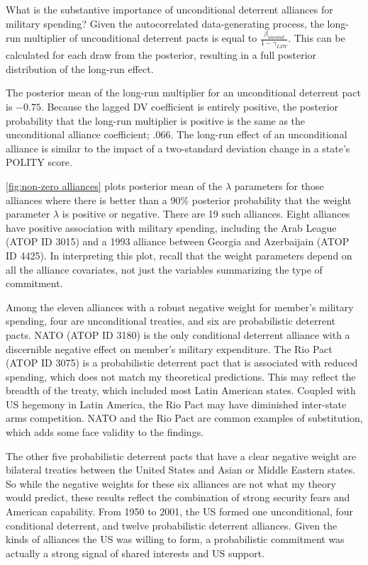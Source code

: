 \documentclass[12pt]{article}
\begin{document}
What is the substantive importance of unconditional deterrent alliances for military spending? Given the autocorrelated data-generating process, the long-run multiplier of unconditional deterrent pacts is equal to $\frac{\beta_{uncond}}{ 1 - \gamma_{LDV}}$. This can be calculated for each draw from the posterior, resulting in a full posterior distribution of the long-run effect. 

The posterior mean of the long-run multiplier for an unconditional deterrent pact is $-0.75$. Because the lagged DV coefficient is entirely positive, the posterior probability that the long-run multiplier is positive is the same as the unconditional alliance coefficient; $.066$. The long-run effect of an unconditional alliance is similar to the impact of a two-standard deviation change in a state's POLITY score. 

\autoref{fig:non-zero alliances} plots posterior mean of the $\lambda$ parameters for those alliances where there is better than a 90\% posterior probability that the weight parameter $\lambda$ is positive or negative. There are 19 such alliances. Eight alliances have positive association with military spending, including the Arab League (ATOP ID 3015) and a 1993 alliance between Georgia and Azerbaijain (ATOP ID 4425). In interpreting this plot, recall that the weight parameters depend on all the alliance covariates, not just the variables summarizing the type of commitment. 

Among the eleven alliances with a robust negative weight for member's military spending, four are unconditional treaties, and six are probabilistic deterrent pacts. NATO (ATOP ID 3180) is the only conditional deterrent alliance with a discernible negative effect on member's military expenditure.  The Rio Pact (ATOP ID 3075) is a probabilistic deterrent pact that is associated with reduced spending, which does not match my theoretical predictions. This may reflect the breadth of the treaty, which included most Latin American states. Coupled with US hegemony in Latin America, the Rio Pact may have diminished inter-state arms competition. NATO and the Rio Pact are common examples of substitution, which adds some face validity to the findings. 

The other five probabilistic deterrent pacts that have a clear negative weight are bilateral treaties between the United States and Asian or Middle Eastern states. So while the negative weights for these six alliances are not what my theory would predict, these results reflect the combination of strong security fears and American capability. From 1950 to 2001, the US formed one unconditional, four conditional deterrent, and twelve probabilistic deterrent alliances. Given the kinds of alliances the US was willing to form, a probabilistic commitment was actually a strong signal of shared interests and US support. 
\end{document}
